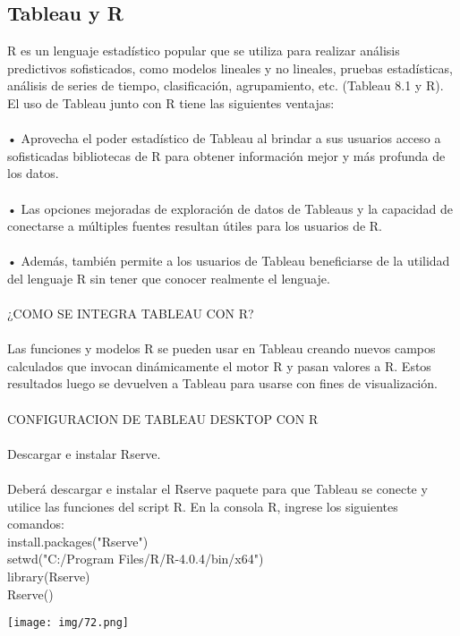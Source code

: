 \documentclass[12pt,letterpaper]{article}
\begin{document}
\subsection{Tableau y R}
R es un lenguaje estadístico popular que se utiliza para realizar análisis predictivos sofisticados, como
modelos lineales y no lineales, pruebas estadísticas, análisis de series de tiempo, clasificación,
agrupamiento, etc. (Tableau 8.1 y R). El uso de Tableau junto con R tiene las siguientes ventajas:
\\\\• Aprovecha el poder estadístico de Tableau al brindar a sus usuarios acceso a sofisticadas
bibliotecas de R para obtener información mejor y más profunda de los datos.
\\\\• Las opciones mejoradas de exploración de datos de Tableaus y la capacidad de conectarse a
múltiples fuentes resultan útiles para los usuarios de R.
\\\\• Además, también permite a los usuarios de Tableau beneficiarse de la utilidad del lenguaje R
sin tener que conocer realmente el lenguaje.
\\\\¿COMO SE INTEGRA TABLEAU CON R?
\\\\Las funciones y modelos R se pueden usar en Tableau creando nuevos campos calculados que invocan
dinámicamente el motor R y pasan valores a R. Estos resultados luego se devuelven a Tableau para
usarse con fines de visualización.
\\\\CONFIGURACION DE TABLEAU DESKTOP CON R
\\\\Descargar e instalar Rserve.
\\\\Deberá descargar e instalar el Rserve paquete para que Tableau se conecte y utilice las funciones del
script R. En la consola R, ingrese los siguientes comandos:
\\install.packages("Rserve")
\\setwd("C:/Program Files/R/R-4.0.4/bin/x64")
\\library(Rserve)
\\Rserve()
\begin{center}
    \texttt{[image: img/72.png]}  
\end{center}
\end{document}
